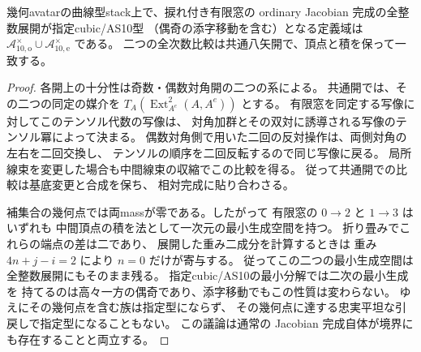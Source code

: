 \begin{theorem}[幾何avatarの指定AS適合開と貼合せ]
\label{thm:qa-avatar-designated-as-locus}
幾何avatarの曲線型stack上で、捩れ付き有限窓の
ordinary Jacobian 完成の全整数展開が指定cubic/AS10型
（偶奇の添字移動を含む）となる定義域は
$\mathcal A_{10,\mathrm o}^{\times}\cup
 \mathcal A_{10,\mathrm e}^{\times}$ である。
二つの全次数比較は共通八矢開で、頂点と積を保って一致する。
\end{theorem}
\begin{proof}
各開上の十分性は奇数・偶数対角開の二つの系による。
共通開では、その二つの同定の媒介を
$T_A(\operatorname{Ext}^2_{A^e}(A,A^e))$ とする。
有限窓を同定する写像に対してこのテンソル代数の写像は、
対角加群とその双対に誘導される写像のテンソル冪によって決まる。
偶数対角側で用いた二回の反対操作は、両側対角の左右を二回交換し、
テンソルの順序を二回反転するので同じ写像に戻る。
局所線束を変更した場合も中間線束の収縮でこの比較を得る。
従って共通開での比較は基底変更と合成を保ち、
相対完成に貼り合わさる。

補集合の幾何点では両massが零である。したがって
有限窓の $0\to2$ と $1\to3$ はいずれも
中間頂点の積を法として一次元の最小生成空間を持つ。
折り畳みでこれらの端点の差は二であり、
展開した重み二成分を計算するときは
重み $4n+j-i=2$ により $n=0$ だけが寄与する。
従ってこの二つの最小生成空間は全整数展開にもそのまま残る。
指定cubic/AS10の最小分解では二次の最小生成を
持てるのは高々一方の偶奇であり、添字移動でもこの性質は変わらない。
ゆえにその幾何点を含む族は指定型にならず、
その幾何点に達する忠実平坦な引戻しで指定型になることもない。
この議論は通常の Jacobian 完成自体が境界にも存在することと両立する。
\end{proof}

